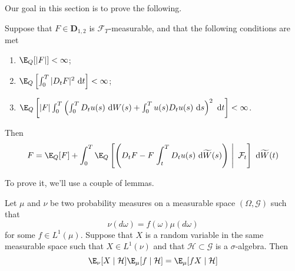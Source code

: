 Our goal in this section is to prove the following. 

\begin{theorem}\label{thm:clark-ocone-change-measure}
Suppose that $F \in \mathbf{D}_{1,2}$ is $\mathcal{F}_T$-measurable, and that the following conditions are met
\begin{enumerate}
	\item $\E_Q[|F|] < \infty$;
	\item $\E_Q \left[ \int_0^T |D_t F|^2 ~\mathrm{d}t \right] < \infty$;
	\item $\E_Q \left[ |F| \int_0^T \left( \int_0^T D_t u(s) ~\mathrm{d}W(s) + \int_0^T u(s) D_t u(s) ~\mathrm{d}s \right)^2 ~\mathrm{d}t \right] < \infty$. 
\end{enumerate}

Then
\begin{equation*}
	F = \E_Q[F] + \int_0^T \E_Q \left[ \left( D_t F - F \left. \int_t^T D_t u(s) ~\mathrm{d}\widetilde{W}(s) \right) ~ \right|~  \mathcal{F}_t \right] ~\mathrm{d}\widetilde{W}(t)
\end{equation*}

\end{theorem}

To prove it, we'll use a couple of lemmas. 

\begin{lemma}
	Let $\mu$ and $\nu$ be two probability measures on a measurable space $(\Omega, \mathcal{G})$ such that 
\[
	\nu(d \omega) = f(\omega) \mu(d \omega)
\]
for some $f \in L^1(\mu)$. Suppose that $X$ is a random variable in the same measurable space such that $X \in L^1(\nu)$ and that $\mathcal{H} \subset \mathcal{G}$ is a $\sigma$-algebra. Then 
\begin{equation}
	\E_\nu [X \mid \mathcal{H}] \E_\mu [f \mid \mathcal{H}] = \E_\mu [f X \mid \mathcal{H}]
\end{equation}
\end{lemma}


